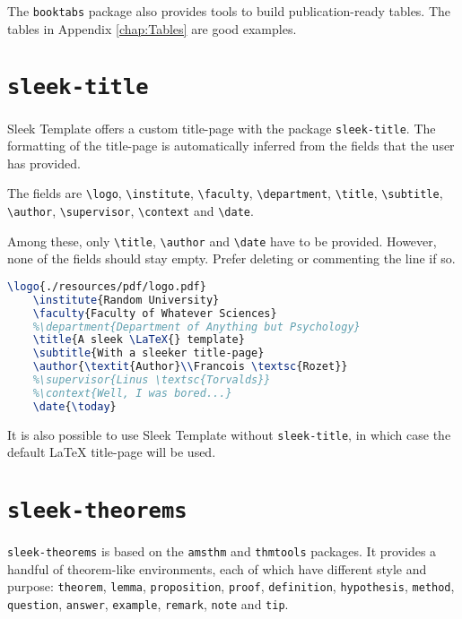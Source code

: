 \documentclass[a4paper, 12pt]{report}
\def\tbs{\textbackslash}
\begin{document}
    The \texttt{booktabs} package also provides tools to build publication-ready tables. The tables in Appendix \ref{chap:Tables} are good examples.

    \newpage

    \section{\texttt{sleek-title}}

    Sleek Template offers a custom title-page with the package \texttt{sleek-title}. The formatting of the title-page is automatically inferred from the fields that the user has provided.

    The fields are \texttt{\tbs{}logo}, \texttt{\tbs{}institute}, \texttt{\tbs{}faculty}, \texttt{\tbs{}department}, \texttt{\tbs{}title}, \texttt{\tbs{}subtitle}, \texttt{\tbs{}author}, \texttt{\tbs{}supervisor}, \texttt{\tbs{}context} and \texttt{\tbs{}date}.

    Among these, only \texttt{\tbs{}title}, \texttt{\tbs{}author} and \texttt{\tbs{}date} have to be provided. However, none of the fields should stay empty. Prefer deleting or commenting the line if so.

    \begin{lstlisting}[style=ruled, language=latex, caption={Example of \texttt{sleek-title} title-page definition.}, gobble=4]
    \logo{./resources/pdf/logo.pdf}
    \institute{Random University}
    \faculty{Faculty of Whatever Sciences}
    %\department{Department of Anything but Psychology}
    \title{A sleek \LaTeX{} template}
    \subtitle{With a sleeker title-page}
    \author{\textit{Author}\\Francois \textsc{Rozet}}
    %\supervisor{Linus \textsc{Torvalds}}
    %\context{Well, I was bored...}
    \date{\today}
    \end{lstlisting}

    It is also possible to use Sleek Template without \texttt{sleek-title}, in which case the default \LaTeX{} title-page will be used.

    \newpage

    \section{\texttt{sleek-theorems}}

    \texttt{sleek-theorems} is based on the \texttt{amsthm} and \texttt{thmtools} packages. It provides a handful of theorem-like environments, each of which have different style and purpose: \texttt{theorem}, \texttt{lemma}, \texttt{proposition}, \texttt{proof}, \texttt{definition}, \texttt{hypothesis}, \texttt{method}, \texttt{question}, \texttt{answer}, \texttt{example}, \texttt{remark}, \texttt{note} and \texttt{tip}.
\end{document}
